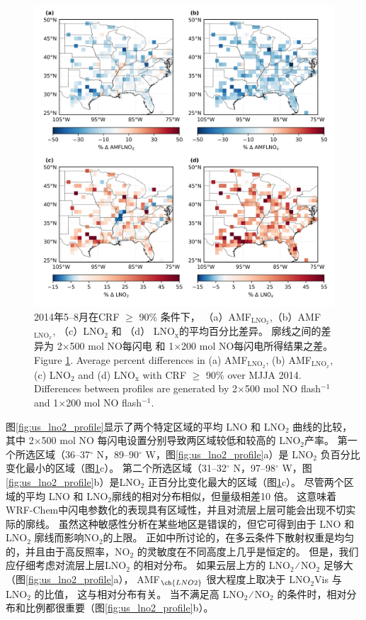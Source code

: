 \begin{figure}[!htbp]
\centering
\includegraphics[width=13cm]{./figures/us_simulation_diff.png}
\caption{2014年5--8月在CRF $\geq$ 90\% 条件下，
（a）AMF$_{\textrm{LNO$_2$}}$,（b）AMF$_{\textrm{LNO$_x$}}$,
（c）LNO$_\textrm{2}$ 和 （d） LNO$_\textrm{x}$的平均百分比差异。
廓线之间的差异为 2$\times$500 mol NO每闪电 和 1$\times$200 mol NO每闪电所得结果之差。\\
Figure \ref{fig:us_simulation_diff}. Average percent differences in (a) AMF$_{\textrm{LNO$_2$}}$, (b) AMF$_{\textrm{LNO$_x$}}$, (c) LNO$_\textrm{2}$ and (d) LNO$_\textrm{x}$ with CRF $\geq$ 90\% over MJJA 2014.
Differences between profiles are generated by 2$\times$500 mol NO flash$^{-1}$ and 1$\times$200 mol NO flash$^{-1}$.}
\label{fig:us_simulation_diff}
\end{figure}

图\ref{fig:us_lno2_profile}显示了两个特定区域的平均 LNO 和 LNO$_2$ 曲线的比较，
其中 2$\times$500 mol NO 每闪电设置分别导致两区域较低和较高的 LNO$_2$产率。
第一个所选区域（36--37$^{\circ}$ N，89--90$^{\circ}$ W，图\ref{fig:us_lno2_profile}a）是 LNO$_2$ 负百分比变化最小的区域（图\ref{fig:us_simulation_diff}c）。
第二个所选区域（31--32$^{\circ}$ N，97--98$^{\circ}$ W，图\ref{fig:us_lno2_profile}b）是LNO$_2$ 正百分比变化最大的区域（图\ref{fig:us_simulation_diff}c）。
尽管两个区域的平均 LNO 和 LNO$_2$廓线的相对分布相似，但量级相差10 倍。
这意味着 WRF-Chem中闪电参数化的表现具有区域性，并且对流层上层可能会出现不切实际的廓线。
虽然这种敏感性分析在某些地区是错误的，但它可得到由于 LNO 和 LNO$_2$ 廓线而影响NO$_2$的上限。
正如\citet{Laughner.2017}中所讨论的，在多云条件下散射权重是均匀的，并且由于高反照率，NO$_2$ 的灵敏度在不同高度上几乎是恒定的。
但是，我们应仔细考虑对流层上层LNO$_2$ 的相对分布。
如果云层上方的 LNO$_2$ ∕ NO$_2$ 足够大（图\ref{fig:us_lno2_profile}a），
AMF$_{\ch{LNO2}}$ 很大程度上取决于 LNO$_2$Vis 与 LNO$_2$ 的比值，
这与相对分布有关。
当不满足高 LNO$_2$ ∕ NO$_2$ 的条件时，相对分布和比例都很重要（图\ref{fig:us_lno2_profile}b）。

